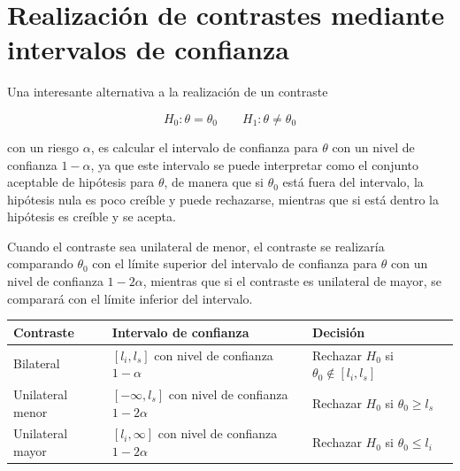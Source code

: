 \documentclass[
  spanish,
  a4paper,
]{scrreport}
\newcounter{none} %
\theoremstyle{plain}
\theoremstyle{definition}
\theoremstyle{definition}
\theoremstyle{remark}
\begin{document}
\section{Realización de contrastes mediante intervalos de
confianza}\label{realizaciuxf3n-de-contrastes-mediante-intervalos-de-confianza}

Una interesante alternativa a la realización de un contraste

\[
H_0: \theta=\theta_0\qquad H_1: \theta\neq \theta_0
\]

con un riesgo \(\alpha\), es calcular el intervalo de confianza para
\(\theta\) con un nivel de confianza \(1-\alpha\), ya que este intervalo
se puede interpretar como el conjunto aceptable de hipótesis para
\(\theta\), de manera que si \(\theta_0\) está fuera del intervalo, la
hipótesis nula es poco creíble y puede rechazarse, mientras que si está
dentro la hipótesis es creíble y se acepta.

Cuando el contraste sea unilateral de menor, el contraste se realizaría
comparando \(\theta_0\) con el límite superior del intervalo de
confianza para \(\theta\) con un nivel de confianza \(1-2\alpha\),
mientras que si el contraste es unilateral de mayor, se comparará con el
límite inferior del intervalo.

{\def\LTcaptype{none} %
\begin{longtable}[]{@{}
  >{\centering\arraybackslash}p{}
  >{\centering\arraybackslash}p{}
  >{\centering\arraybackslash}p{}@{}}
\toprule\noalign{}
\begin{minipage}[b]{\linewidth}\centering
Contraste
\end{minipage} & \begin{minipage}[b]{\linewidth}\centering
Intervalo de confianza
\end{minipage} & \begin{minipage}[b]{\linewidth}\centering
Decisión
\end{minipage} \\
\midrule\noalign{}
\endhead
\bottomrule\noalign{}
\endlastfoot
Bilateral & \([l_i,l_s]\) con nivel de confianza \(1-\alpha\) & Rechazar
\(H_0\) si \(\theta_0\not \in [l_i,l_s]\) \\
Unilateral menor & \([-\infty,l_s]\) con nivel de confianza
\(1-2\alpha\) & Rechazar \(H_0\) si \(\theta_0\geq l_s\) \\
Unilateral mayor & \([l_i,\infty]\) con nivel de confianza \(1-2\alpha\)
& Rechazar \(H_0\) si \(\theta_0\leq l_i\) \\
\end{longtable}
}
\end{document}
